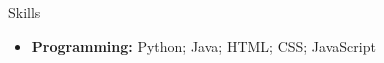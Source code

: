 \documentclass[]{mcdowellcv}
\begin{document}
\begin{cvsection}{Skills}
    \begin{cvsubsection}{}{}{}	
        \begin{itemize}
            \item \textbf{Programming:} Python; Java; HTML; CSS; JavaScript
        \end{itemize}
        
    \end{cvsubsection}

\end{cvsection}


	
\end{document}
